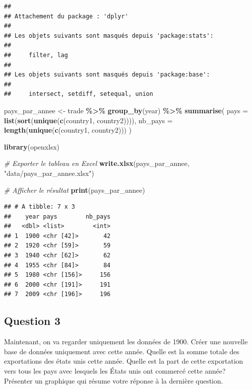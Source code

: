 \documentclass[
]{article}
\newenvironment{Shaded}{\begin{snugshade}}{\end{snugshade}}
\newcommand{\AttributeTok}[1]{\textcolor[rgb]{0.13,0.29,0.53}{#1}}
\newcommand{\CommentTok}[1]{\textcolor[rgb]{0.56,0.35,0.01}{\textit{#1}}}
\newcommand{\FunctionTok}[1]{\textcolor[rgb]{0.13,0.29,0.53}{\textbf{#1}}}
\newcommand{\NormalTok}[1]{#1}
\newcommand{\OtherTok}[1]{\textcolor[rgb]{0.56,0.35,0.01}{#1}}
\newcommand{\SpecialCharTok}[1]{\textcolor[rgb]{0.81,0.36,0.00}{\textbf{#1}}}
\newcommand{\StringTok}[1]{\textcolor[rgb]{0.31,0.60,0.02}{#1}}
\begin{document}
\begin{verbatim}
## 
## Attachement du package : 'dplyr'
## 
## Les objets suivants sont masqués depuis 'package:stats':
## 
##     filter, lag
## 
## Les objets suivants sont masqués depuis 'package:base':
## 
##     intersect, setdiff, setequal, union
\end{verbatim}

\begin{Shaded}
\begin{Highlighting}[]
\NormalTok{pays\_par\_annee }\OtherTok{\textless{}{-}}\NormalTok{ trade }\SpecialCharTok{\%\textgreater{}\%}
  \FunctionTok{group\_by}\NormalTok{(year) }\SpecialCharTok{\%\textgreater{}\%}
  \FunctionTok{summarise}\NormalTok{(}
    \AttributeTok{pays =} \FunctionTok{list}\NormalTok{(}\FunctionTok{sort}\NormalTok{(}\FunctionTok{unique}\NormalTok{(}\FunctionTok{c}\NormalTok{(country1, country2)))),}
    \AttributeTok{nb\_pays =} \FunctionTok{length}\NormalTok{(}\FunctionTok{unique}\NormalTok{(}\FunctionTok{c}\NormalTok{(country1, country2)))}
\NormalTok{  )}



\FunctionTok{library}\NormalTok{(openxlsx)}

\CommentTok{\# Exporter le tableau en Excel}
\FunctionTok{write.xlsx}\NormalTok{(pays\_par\_annee, }\StringTok{"data/pays\_par\_annee.xlsx"}\NormalTok{)}

\CommentTok{\# Afficher le résultat}
\FunctionTok{print}\NormalTok{(pays\_par\_annee)}
\end{Highlighting}
\end{Shaded}

\begin{verbatim}
## # A tibble: 7 x 3
##    year pays        nb_pays
##   <dbl> <list>        <int>
## 1  1900 <chr [42]>       42
## 2  1920 <chr [59]>       59
## 3  1940 <chr [62]>       62
## 4  1955 <chr [84]>       84
## 5  1980 <chr [156]>     156
## 6  2000 <chr [191]>     191
## 7  2009 <chr [196]>     196
\end{verbatim}

\subsection{Question 3}\label{question-3}

Maintenant, on va regarder uniquement les données de 1900. Créer une
nouvelle base de données uniquement avec cette année. Quelle est la
somme totale des exportations des états unis cette année. Quelle est la
part de cette exportation vers tous les pays avec lesquels les États
unis ont commercé cette année? Présenter un graphique qui résume votre
réponse à la dernière question.
\end{document}
